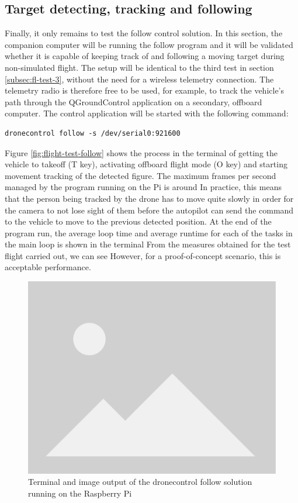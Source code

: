 \subsection{Target detecting, tracking and following}
\label{subsec:fl-test-5}


Finally, it only remains to test the follow control solution.
In this section, the companion computer will be running the follow program and it will be validated whether it is capable of keeping track of and following a moving target during non-simulated flight.
The setup will be identical to the third test in section \ref{subsec:fl-test-3}, without the need for a wireless telemetry connection.
The telemetry radio is therefore free to be used, for example, to track the vehicle's path through the QGroundControl application on a secondary, offboard computer.
The control application will be started with the following command:
\begin{verbatim}
dronecontrol follow -s /dev/serial0:921600
\end{verbatim}
Figure \ref{fig:flight-test-follow} shows the process in the terminal of getting the vehicle to takeoff (T key), activating offboard flight mode (O key) and starting movement tracking of the detected figure.
The maximum frames per second managed by the program running on the Pi is around %
In practice, this means that the person being tracked by the drone has to move quite slowly in order for the camera to not lose sight of them before the autopilot can send the command to the vehicle to move to the previous detected position.
At the end of the program run, the average loop time and average runtime for each of the tasks in the main loop is shown in the terminal
From the measures obtained for the test flight carried out, we can see %
However, for a proof-of-concept scenario, this is acceptable performance.


\begin{figure}
  \centering
  \includegraphics[width=.6\textwidth, keepaspectratio]{img/placeholder.png}
  \caption{Terminal and image output of the dronecontrol follow solution running on the  Raspberry Pi}\label{fig:aaa}
\end{figure}

